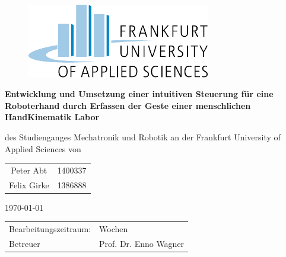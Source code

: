 \documentclass[a4paper,12pt,final]{article} %
\numberwithin{equation}{section} %
\numberwithin{figure}{section} %
\numberwithin{table}{section} %
\begin{document}
\begin{center} %
	\begin{figure}[h]
	\begin{center}
		\includegraphics[width=8cm]{Bilder/logo.pdf} %
		\vspace{2cm}
	\end{center}
	\end{figure}
	\begin{Large}	
		\textbf{Entwicklung und Umsetzung einer intuitiven Steuerung für eine Roboterhand durch Erfassen
		der Geste einer menschlichen Hand\linebreak \linebreak Kinematik Labor\\}
		\vspace{1.5cm}
	\end{Large}
	\begin{large}
		des Studienganges Mechatronik und Robotik\linebreak		
		an der Frankfurt University of Applied Sciences\linebreak\linebreak
		von
		\begin{longtable}[b]{c c}
		Peter Abt & 1400337\\
		Felix Girke & 1386888\\
		\end{longtable}
		\vspace{1cm}
		\today\linebreak \linebreak
		\begin{longtable}[b]{p{7.9cm} p{6.9cm}}
		Bearbeitungszeitraum: & Wochen\\
		Betreuer & Prof. Dr. Enno Wagner
		\end{longtable}
	\end{large}
\end{center} 
\thispagestyle{empty}%
\setcounter{page}{0}
\newpage
{}
\end{document}
